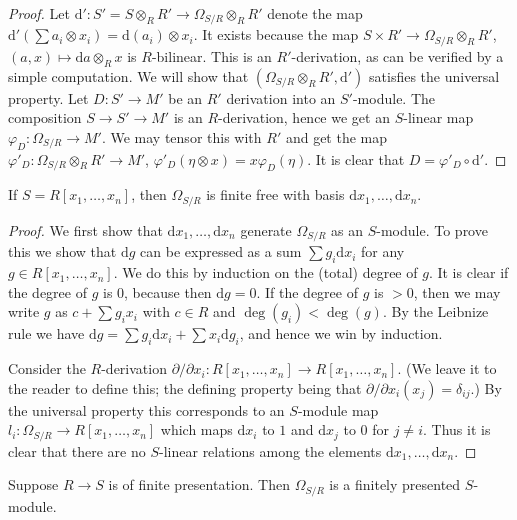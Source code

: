 \begin{proof}
Let $\text{d}' : S' = S\otimes_R R' \to \Omega_{S/R} \otimes_R R'$ denote the
map $\text{d}'( \sum a_i \otimes x_i ) = \text{d}(a_i) \otimes x_i$.
It exists because the map $S \times R' \to \Omega_{S/R} \otimes_R R'$,
$(a,x)\mapsto \text{d}a\otimes_R x$ is $R$-bilinear.
This is an $R'$-derivation, as can be verified by a simple computation.
We will show that $(\Omega_{S/R} \otimes_R R', \text{d}')$ satisfies
the universal property. Let $D : S' \to M'$ be an $R'$ derivation
into an $S'$-module. The composition $S \to S' \to M'$ is an $R$-derivation,
hence we get an $S$-linear map $\varphi_D : \Omega_{S/R} \to M'$. We may
tensor this with $R'$ and get the map $\varphi'_D : 
\Omega_{S/R} \otimes_R R' \to M'$, $\varphi'_D(\eta \otimes x) =
x\varphi_D(\eta)$. It is clear that $D = \varphi'_D \circ \text{d}'$.
\end{proof}

\begin{lemma}
\label{lemma-differentials-polynomial-ring}
If $S = R[x_1,\ldots,x_n]$, then 
$\Omega_{S/R}$ is finite free with
basis $\text{d}x_1,\ldots, \text{d}x_n$.
\end{lemma}

\begin{proof}
We first show that $\text{d}x_1,\ldots, \text{d}x_n$
generate $\Omega_{S/R}$ as an $S$-module. To prove this
we show that $\text{d}g$ can be expressed as a 
sum $\sum g_i \text{d}x_i$ for any $g \in R[x_1,\ldots,x_n]$.
We do this by induction on the (total) degree of $g$.
It is clear if the degree of $g$ is $0$, because then
$\text{d}g = 0$. If the degree of $g$ is $>0$, then
we may write $g$ as $c + \sum g_i x_i$ with $c\in R$
and $\deg(g_i) < \deg(g)$. By the Leibnize rule we have
$\text{d}g = \sum g_i \text{d} x_i + \sum x_i \text{d}g_i$,
and hence we win by induction.

\medskip\noindent
Consider the $R$-derivation $\partial / \partial x_i :
R[x_1,\ldots,x_n] \to R[x_1,\ldots,x_n]$. (We leave it to
the reader to define this; the defining property
being that $\partial / \partial x_i (x_j) = \delta_{ij}$.)
By the universal property this corresponds to an $S$-module map $l_i : 
\Omega_{S/R} \to R[x_1,\ldots,x_n]$ which maps $\text{d}x_i$
to $1$ and $\text{d}x_j$ to $0$ for $j \not= i$. 
Thus it is clear that there are no $S$-linear relations
among the elements $\text{d}x_1,\ldots, \text{d}x_n$.
\end{proof}

\begin{lemma}
\label{lemma-differentials-finitely-presented}
Suppose $R \to S$ is of finite presentation.
Then $\Omega_{S/R}$ is a finitely presented
$S$-module.
\end{lemma}

